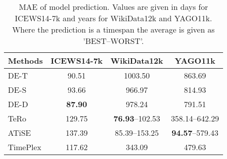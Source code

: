 \begin{table}[htb]
\centering
\begin{minipage}{0.95\columnwidth}
\centering
\caption{MAE of model prediction. Values are given in days for ICEWS14-7k and years for WikiData12k and YAGO11k. Where the prediction is a timespan the average is given as '\textsc{BEST}–\textsc{WORST}'.}
\vspace{-3mm}

\begin{tabular}{lccc}
\hline
Methods & ICEWS14-7k & WikiData12k & YAGO11k\\
\hline
DE-T & 90.51 & 1003.50 & 863.69\\
DE-S & 93.66 & 966.97 & 814.93\\
DE-D & \textbf{87.90} & 978.24 & 791.51\\
TeRo & 129.75 & \textbf{76.93}–102.53 & 358.14–642.29\\
ATiSE & 137.39 & 85.39–153.25 & \textbf{94.57}–579.43\\
TimePlex & 117.62 & 343.09 & 479.63\\
\hline
\end{tabular}


\label{tab:time_prediction_mae}
\end{minipage}
\end{table}